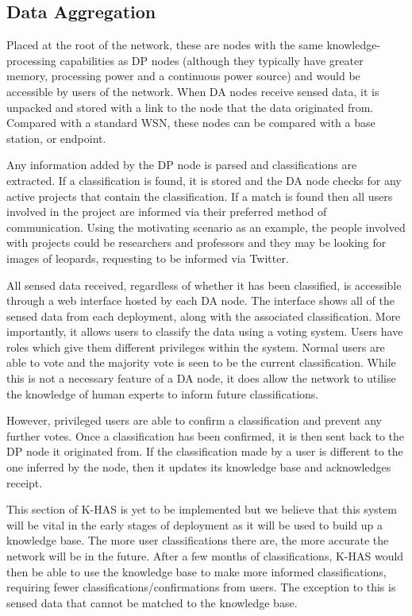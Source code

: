 	\subsection{Data Aggregation}
	Placed at the root of the network, these are nodes with the same knowledge-processing capabilities as DP nodes (although they typically have greater memory, processing power and a continuous power source) and would be accessible by users of the network. When DA nodes receive sensed data, it is unpacked and stored with a link to the node that the data originated from. Compared with a standard WSN, these nodes can be compared with a base station, or endpoint.
	
	Any information added by the DP node is parsed and classifications are extracted. If a classification is found, it is stored and the DA node checks for any active projects that contain the classification. If a match is found then all users involved in the project are informed via their preferred method of communication. Using the motivating scenario as an example, the people involved with projects could be researchers and professors and they may be looking for images of leopards, requesting to be informed via Twitter.
	
	All sensed data received, regardless of whether it has been classified, is accessible through a web interface hosted by each DA node. The interface shows all of the sensed data from each deployment, along with the associated classification. More importantly, it allows users to classify the data using a voting system. Users have roles which give them different privileges within the system. Normal users are able to vote and the majority vote is seen to be the current classification. While this is not a necessary feature of a DA node, it does allow the network to utilise the knowledge of human experts to inform future classifications.
	
	However, privileged users are able to confirm a classification and prevent any further votes. Once a classification has been confirmed, it is then sent back to the DP node it originated from. If the classification made by a user is different to the one inferred by the node, then it updates its knowledge base and acknowledges receipt.

	This section of K-HAS is yet to be implemented but we believe that this system will be vital in the early stages of deployment as it will be used to build up a knowledge base. The more user classifications there are, the more accurate the network will be in the future. After a few months of classifications, K-HAS would then be able to use the knowledge base to make more informed classifications, requiring fewer classifications/confirmations from users. The exception to this is sensed data that cannot be matched to the knowledge base. 
	
